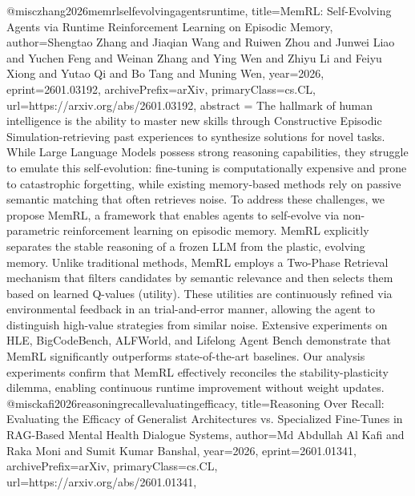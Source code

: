 {}@misc{zhang2026memrlselfevolvingagentsruntime,
      title={MemRL: Self-Evolving Agents via Runtime Reinforcement Learning on Episodic Memory}, 
      author={Shengtao Zhang and Jiaqian Wang and Ruiwen Zhou and Junwei Liao and Yuchen Feng and Weinan Zhang and Ying Wen and Zhiyu Li and Feiyu Xiong and Yutao Qi and Bo Tang and Muning Wen},
      year={2026},
      eprint={2601.03192},
      archivePrefix={arXiv},
      primaryClass={cs.CL},
      url={https://arxiv.org/abs/2601.03192},
      abstract = {The hallmark of human intelligence is the ability to master new skills through Constructive Episodic Simulation-retrieving past experiences to synthesize solutions for novel tasks. While Large Language Models possess strong reasoning capabilities, they struggle to emulate this self-evolution: fine-tuning is computationally expensive and prone to catastrophic forgetting, while existing memory-based methods rely on passive semantic matching that often retrieves noise. To address these challenges, we propose MemRL, a framework that enables agents to self-evolve via non-parametric reinforcement learning on episodic memory. MemRL explicitly separates the stable reasoning of a frozen LLM from the plastic, evolving memory. Unlike traditional methods, MemRL employs a Two-Phase Retrieval mechanism that filters candidates by semantic relevance and then selects them based on learned Q-values (utility). These utilities are continuously refined via environmental feedback in an trial-and-error manner, allowing the agent to distinguish high-value strategies from similar noise. Extensive experiments on HLE, BigCodeBench, ALFWorld, and Lifelong Agent Bench demonstrate that MemRL significantly outperforms state-of-the-art baselines. Our analysis experiments confirm that MemRL effectively reconciles the stability-plasticity dilemma, enabling continuous runtime improvement without weight updates.}
}@misc{kafi2026reasoningrecallevaluatingefficacy,
      title={Reasoning Over Recall: Evaluating the Efficacy of Generalist Architectures vs. Specialized Fine-Tunes in RAG-Based Mental Health Dialogue Systems}, 
      author={Md Abdullah Al Kafi and Raka Moni and Sumit Kumar Banshal},
      year={2026},
      eprint={2601.01341},
      archivePrefix={arXiv},
      primaryClass={cs.CL},
      url={https://arxiv.org/abs/2601.01341},
}
